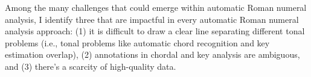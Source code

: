 

Among the many challenges that could emerge within automatic
Roman numeral analysis, I identify three that are impactful
in every automatic Roman numeral analysis approach: (1) it is difficult to draw a clear line separating
different tonal problems (i.e., tonal problems like automatic chord recognition and key estimation overlap), (2)
annotations in chordal and key analysis are ambiguous, and (3) there's a scarcity of high-quality data.
